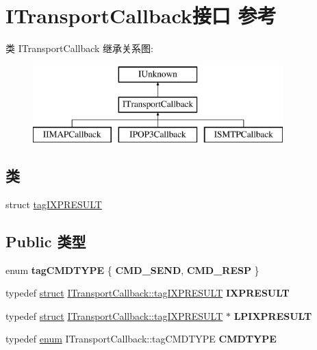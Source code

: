 \hypertarget{interface_i_transport_callback}{}\section{I\+Transport\+Callback接口 参考}
\label{interface_i_transport_callback}
类 I\+Transport\+Callback 继承关系图\+:\begin{figure}[H]
\begin{center}
\leavevmode
\includegraphics[height=3.000000cm]{interface_i_transport_callback}
\end{center}
\end{figure}
\subsection*{类}
\begin{DoxyCompactItemize}
\item 
struct \hyperlink{struct_i_transport_callback_1_1tag_i_x_p_r_e_s_u_l_t}{tag\+I\+X\+P\+R\+E\+S\+U\+LT}
\end{DoxyCompactItemize}
\subsection*{Public 类型}
\begin{DoxyCompactItemize}
\item 
\mbox{\label{interface_i_transport_callback_af412819b8f035ba5beef56be11eb4af7}} 
enum {\bfseries tag\+C\+M\+D\+T\+Y\+PE} \{ {\bfseries C\+M\+D\+\_\+\+S\+E\+ND}, 
{\bfseries C\+M\+D\+\_\+\+R\+E\+SP}
 \}
\item 
\mbox{\label{interface_i_transport_callback_a65b7f6e8bd5e748d9eb45819cc2e418c}} 
typedef \hyperlink{interfacestruct}{struct} \hyperlink{struct_i_transport_callback_1_1tag_i_x_p_r_e_s_u_l_t}{I\+Transport\+Callback\+::tag\+I\+X\+P\+R\+E\+S\+U\+LT} {\bfseries I\+X\+P\+R\+E\+S\+U\+LT}
\item 
\mbox{\label{interface_i_transport_callback_af4e3db523768f1dbf2572c1c9ee8c1d8}} 
typedef \hyperlink{interfacestruct}{struct} \hyperlink{struct_i_transport_callback_1_1tag_i_x_p_r_e_s_u_l_t}{I\+Transport\+Callback\+::tag\+I\+X\+P\+R\+E\+S\+U\+LT} $\ast$ {\bfseries L\+P\+I\+X\+P\+R\+E\+S\+U\+LT}
\item 
\mbox{\label{interface_i_transport_callback_af746c6f8eddbc62ec8fd4ba27a3c0b34}} 
typedef \hyperlink{interfaceenum}{enum} I\+Transport\+Callback\+::tag\+C\+M\+D\+T\+Y\+PE {\bfseries C\+M\+D\+T\+Y\+PE}
\end{DoxyCompactItemize}
